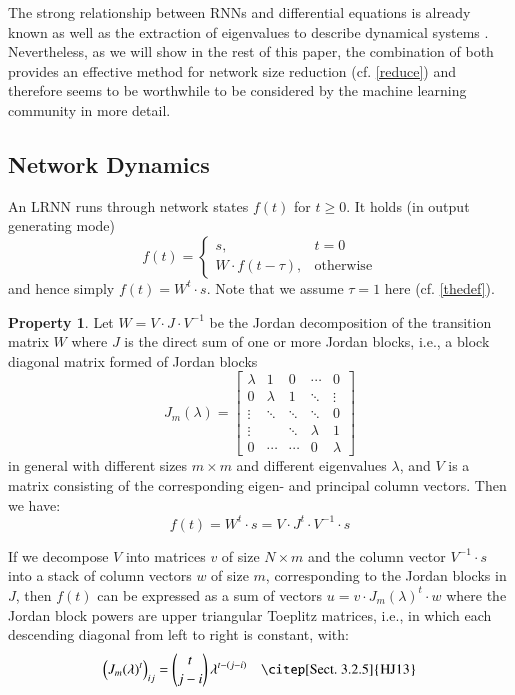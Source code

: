 \documentclass[preprint,12pt,times,authoryear]{elsarticle}%
\theoremstyle{definition}
\newtheorem{prop}{Property}
\begin{document}
The strong relationship between RNNs and differential equations is already known
\citep[Sect.~9]{KB+16} as well as the extraction of eigenvalues to describe
dynamical systems \citep[Sect.~5]{Str15}. Nevertheless, as we will show in the
rest of this paper, the combination of both provides an effective method for
network size reduction (cf. \cref{reduce}) and therefore seems to be worthwhile
to be considered by the machine learning community in more detail.

\subsection{Network Dynamics}\label{dynamics}

An LRNN runs through network states $f(t)$ for $t
\ge 0$. It holds (in output generating mode)
\[ f(t) = \left\{ \begin{array}{ll}
	s, & t=0\\
	W \cdot f(t-\tau), & \text{otherwise}
\end{array} \right. \]
and hence simply $f(t) = W^t \cdot s$. Note that we assume $\tau = 1$ here (cf. \cref{thedef}).

\begin{prop}\label{jordan}
Let $W = V \cdot J \cdot V^{-1}$ be the Jordan decomposition of the transition
matrix $W$ where $J$ is the direct sum of one or more Jordan blocks, i.e., a
block diagonal matrix formed of Jordan blocks
\[ J_m(\lambda) = \left[ \begin{array}{*{5}{c}}
  \lambda & 1 & 0 & \cdots & 0\\
  0 & \lambda & 1 & \ddots & \vdots\\
  \vdots & \ddots & \ddots & \ddots & 0\\
  \vdots & & \ddots & \lambda & 1\\
  0 & \cdots & \cdots & 0 & \lambda
\end{array} \right] \]
in general with different sizes $m \times m$ and different eigenvalues $\lambda$,
and $V$ is a matrix consisting of the corresponding eigen- and principal column vectors.
Then we have: \[ f(t) = W^t \cdot s = V \cdot J^t \cdot V^{-1} \cdot s \]

If we decompose $V$ into matrices $v$ of size $N \times m$ and the column vector
$V^{-1} \cdot s$ into a stack of column vectors $w$ of size $m$, corresponding
to the Jordan blocks in $J$, then $f(t)$ can be expressed as a sum of vectors $u
= v \cdot J_m(\lambda)^t \cdot w$ where the Jordan block powers are upper
triangular Toeplitz matrices, i.e., in which each descending diagonal from left
to right is constant, with:
\begin{equation}\label{power}
  \Big( J_m(\lambda)^t \Big)_{ij} = \binom{t}{j-i}\,\lambda^{t-(j-i)}
	\quad\text{\citep[Sect.~3.2.5]{HJ13}}
\end{equation}
\end{prop}
\end{document}
